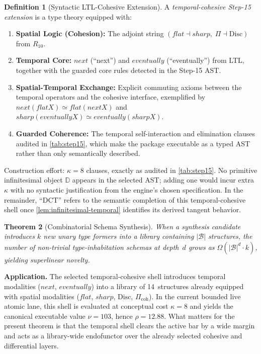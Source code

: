 \documentclass[11pt,a4paper]{article}
\def\flat{flat}%
\def\sharp{sharp}%
\def\bigcirc{next}%
\def\Diamond{eventually}%
\theoremstyle{plain}
\newtheorem{theorem}{Theorem}[section]
\theoremstyle{definition}
\newtheorem{definition}[theorem]{Definition}
\theoremstyle{remark}
\newcommand{\D}{\mathbb{D}}
\newcommand{\Disc}{\mathrm{Disc}}
\begin{document}
\begin{definition}[Syntactic LTL-Cohesive Extension]
\label{def:dct}
A \emph{temporal-cohesive Step-15 extension} is a type theory equipped with:
\begin{enumerate}[label=(\arabic*), nosep]
\item \textbf{Spatial Logic (Cohesion):} The adjoint string $(\flat \dashv \sharp,\; \Pi \dashv \Disc)$ from $R_{10}$.
\item \textbf{Temporal Core:} $\bigcirc$ (``next'') and $\Diamond$ (``eventually'') from LTL, together with the guarded core rules detected in the Step-15 AST.
\item \textbf{Spatial-Temporal Exchange:} Explicit commuting axioms between the temporal operators and the cohesive interface, exemplified by $\bigcirc(\flat X) \simeq \flat(\bigcirc X)$ and $\sharp(\Diamond X) \simeq \Diamond(\sharp X)$.
\item \textbf{Guarded Coherence:} The temporal self-interaction and elimination clauses audited in \cref{tab:step15}, which make the package executable as a typed AST rather than only semantically described.
\end{enumerate}
Construction effort: $\kappa = 8$ clauses, exactly as audited in \cref{tab:step15}.
No primitive infinitesimal object $\D$ appears in the selected AST; adding one would incur extra $\kappa$ with no syntactic justification from the engine's chosen specification.
In the remainder, ``DCT'' refers to the semantic completion of this temporal-cohesive shell once \cref{lem:infinitesimal-temporal} identifies its derived tangent behavior.
\end{definition}

\begin{theorem}[Combinatorial Schema Synthesis]
\label{thm:tensor}
When a synthesis candidate introduces $k$ new unary type formers into a library containing $|\mathcal{B}|$ structures, the number of non-trivial type-inhabitation schemas at depth~$d$ grows as $\Omega(|\mathcal{B}|^d \cdot k)$, yielding superlinear novelty.
\end{theorem}

\noindent \textbf{Application.}
The selected temporal-cohesive shell introduces temporal modalities ($\bigcirc$, $\Diamond$) into a library of 14~structures already equipped with spatial modalities ($\flat$, $\sharp$, $\Disc$, $\Pi_{\mathrm{coh}}$).
In the current bounded live atomic lane, this shell is evaluated at conceptual cost $\kappa=8$ and yields the canonical executable value $\nu = 103$, hence $\rho = 12.88$.
What matters for the present theorem is that the temporal shell clears the active bar by a wide margin and acts as a library-wide endofunctor over the already selected cohesive and differential layers.
\end{document}
